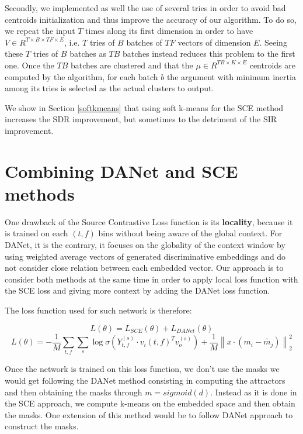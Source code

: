 \documentclass[master, tikz, final,11pt, dvipdfmx]{iscs-thesis}
\newcommand{\norm}[1]{\left\lVert#1\right\rVert}
\begin{document}
Secondly, we implemented as well the use of several tries in order to avoid bad centroids initialization and thus improve the accuracy of our algorithm. To do so, we repeat the input $T$ times along its first dimension in order to have $V\in R^{T \times B\times TF \times E}$, i.e. $T$ tries of $B$ batches of $TF$ vectors of dimension $E$. Seeing these $T$ tries of $B$ batches as $TB$ batches instead reduces this problem to the first one. Once the $TB$ batches are clustered and that the $\mu \in R^{TB\times K \times E}$ centroids are computed by the algorithm, for each batch $b$ the argument with minimum inertia among its tries is selected as the actual clusters to output.

We show in Section \ref{softkmeans} that using soft k-means for the SCE method increases the SDR improvement, but sometimes to the detriment of the SIR improvement.



\section{Combining DANet and SCE methods}

One drawback of the Source Contrastive Loss function is its \textbf{locality}, because it is trained on each $(t,f)$ bins without being aware of the global context. For DANet, it is the contrary, it focuses on the globality of the context window by using weighted average vectors of generated discriminative embeddings and do not consider close relation between each embedded vector.
Our approach is to consider both methods at the same time in order to apply local loss function with the SCE loss and giving more context by adding the DANet loss function.

The loss function used for such network is therefore:

\[L(\theta) = L_{SCE}(\theta) + L_{DANet}(\theta)\]
\[L(\theta) = - \frac{1}{M} \sum_{t,f} \sum_{s} \log \sigma(Y_{t,f}^{(s)} \cdot v_i(t,f)^{T} v_o^{(s)}) + \frac{1}{M} \norm{x \cdot (m_i - \tilde{m_j})}^2_2\]

Once the network is trained on this loss function, we don't use the masks we would get following the DANet method consisting in computing the attractors and then obtaining the masks through $m = sigmoid(d)$. Instead as it is done in the SCE approach, we compute k-means on the embedded space and then obtain the masks. One extension of this method would be to follow DANet approach to construct the masks.
\end{document}
